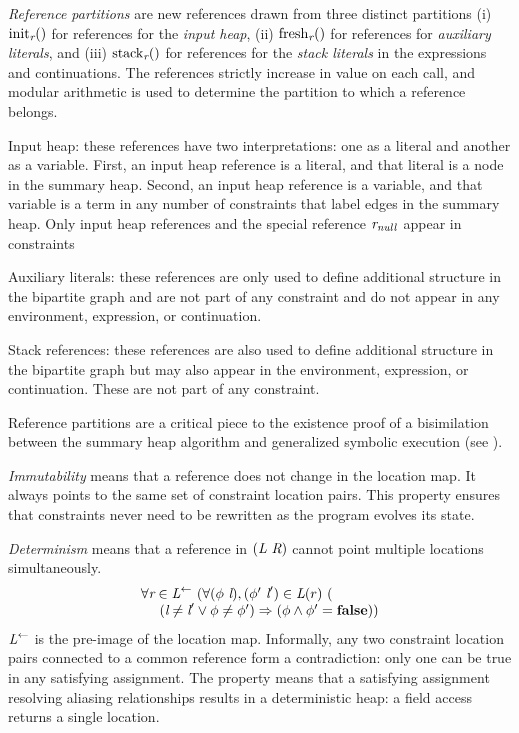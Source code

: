 \emph{Reference partitions} are new references drawn from
  three distinct partitions (i) $\mathrm{init}_{\emph{r}}()$ for references for the \emph{input heap}, (ii) $\mathrm{fresh}_{\emph{r}}()$ for references for \emph{auxiliary literals}, and
  (iii) $\mathrm{stack}_{\emph{r}}()$ for references for the \emph{stack literals} in the expressions and
  continuations. The references strictly increase in value on each
  call, and modular arithmetic is used to determine the partition to
  which a reference belongs.
\begin{compactdesc}
\item[Input heap:] these references have two
  interpretations: one as a literal and another as a variable. First,
  an input heap reference is a literal, and that literal is a node in
  the summary heap. Second, an input heap reference is a variable, and
  that variable is a term in any number of constraints that label
  edges in the summary heap. Only input heap references and the
  special reference $\emph{r}_\mathit{null}$ appear in constraints
\item[Auxiliary literals:] these references are only used to define additional structure in
  the bipartite graph and are not part of any constraint and do not appear
  in any environment, expression, or continuation.
\item[Stack references:] these references are also used to define additional structure in the bipartite graph but may also appear in the environment, expression, or continuation. These are not part of any constraint.
\end{compactdesc}
Reference partitions are a critical piece to the existence proof of a
bisimilation between the summary heap algorithm and generalized
symbolic execution (see ).

\emph{Immutability} means that a reference does not change in the
location map. It always points to the same set of constraint location
pairs. This property ensures that constraints never need to be
rewritten as the program evolves its state.

\emph{Determinism} means that a reference in $(\emph{L}\ \emph{R})$ cannot point multiple locations simultaneously.
$$
\begin{array}{l}
\forall \cfgnt{r} \in \cfgnt{L}^\leftarrow\ (\forall (\phi\ \cfgnt{l}),(\phi^\prime\ \cfgnt{l}^\prime) \in \cfgnt{L}(r)\ (\\
\ \ \ \ (\cfgnt{l} \neq \cfgnt{l}^\prime \vee \phi \neq \phi^\prime) \Rightarrow (\phi \wedge \phi^\prime = \cfgt{false}))
\end{array}
$$
$\emph{L}^\leftarrow$ is the pre-image of the location
map. Informally, any two constraint location pairs connected to a
common reference form a contradiction: only one can be true in any
satisfying assignment. The property means that a satisfying assignment
resolving aliasing relationships results in a deterministic heap: a
field access returns a single location.

